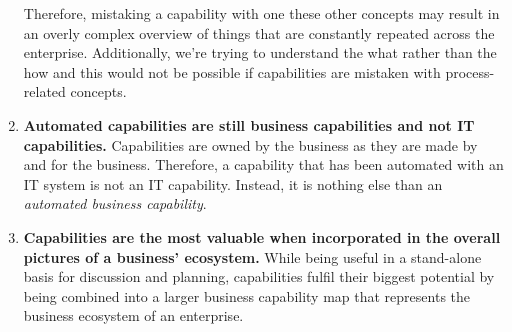 \begin{enumerate}
          Therefore, mistaking a capability with one these other concepts may result in an overly complex overview of
          things that are constantly repeated across the enterprise.
          Additionally, we’re trying to understand the what rather than the how and this would not be possible if
          capabilities are mistaken with  process-related concepts.
    \item \textbf{Automated capabilities are still business capabilities and not IT capabilities.}
          Capabilities are owned by the business as they are made by and for the business.
          Therefore, a capability that has been automated with an IT system is not an IT capability.
          Instead, it is nothing else than an \textit{automated business capability}.
    \item \textbf{Capabilities are the most valuable when incorporated in the overall pictures of a business’ ecosystem.}
          While being useful in a stand-alone basis for discussion and planning, capabilities fulfil their biggest
          potential by being combined into a larger business capability map that represents the business ecosystem
          of an enterprise.
\end{enumerate}